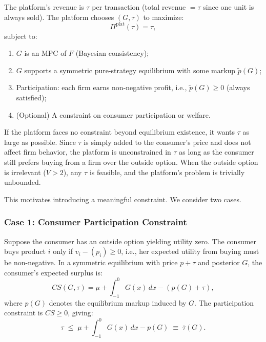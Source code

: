 \documentclass[12pt, a4paper]{article}
\begin{document}
The platform's revenue is $\tau$ per transaction (total revenue $= \tau$ since one unit is always sold). The platform chooses $(G, \tau)$ to maximize:
\begin{equation}
    \Pi^{\text{plat}}(\tau) = \tau,
\end{equation}
subject to:
\begin{enumerate}[nosep]
    \item $G$ is an MPC of $F$ (Bayesian consistency);
    \item $G$ supports a symmetric pure-strategy equilibrium with some markup $\tilde{p}(G)$;
    \item Participation: each firm earns non-negative profit, i.e., $\tilde{p}(G) \geq 0$ (always satisfied);
    \item (Optional) A constraint on consumer participation or welfare.
\end{enumerate}

If the platform faces no constraint beyond equilibrium existence, it wants $\tau$ as large as possible. Since $\tau$ is simply added to the consumer's price and does not affect firm behavior, the platform is unconstrained in $\tau$ as long as the consumer still prefers buying from a firm over the outside option. When the outside option is irrelevant ($V > 2$), any $\tau$ is feasible, and the platform's problem is trivially unbounded.

This motivates introducing a meaningful constraint. We consider two cases.

\subsubsection{Case 1: Consumer Participation Constraint}

Suppose the consumer has an outside option yielding utility zero. The consumer buys product $i$ only if $v_i - (p_i) \geq 0$, i.e., her expected utility from buying must be non-negative. In a symmetric equilibrium with price $p + \tau$ and posterior $G$, the consumer's expected surplus is:
\begin{equation}
    CS(G, \tau) = \mu + \int_{-1}^{0} G(x)\,dx - (p(G) + \tau),
\end{equation}
where $p(G)$ denotes the equilibrium markup induced by $G$. The participation constraint is $CS \geq 0$, giving:
\begin{equation}
    \tau \;\leq\; \mu + \int_{-1}^{0} G(x)\,dx - p(G) \;\equiv\; \bar{\tau}(G).
\end{equation}
\end{document}
